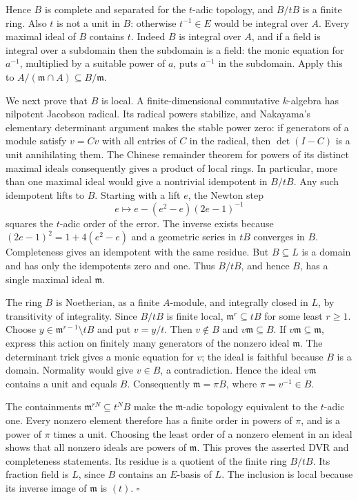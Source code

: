 Hence $B$ is complete and separated for the $t$-adic topology,
and $B/tB$ is a finite ring.  Also $t$ is not a unit in $B$:
otherwise $t^{-1}\in E$ would be integral over $A$.
Every maximal ideal of $B$ contains $t$.  Indeed $B$ is integral
over $A$, and if a field is integral over a subdomain then the
subdomain is a field: the monic equation for $a^{-1}$, multiplied
by a suitable power of $a$, puts $a^{-1}$ in the subdomain.
Apply this to $A/(\mathfrak m\cap A)\subseteq B/\mathfrak m$.

We next prove that $B$ is local.  A finite-dimensional
commutative $k$-algebra has nilpotent Jacobson radical.  Its
radical powers stabilize, and Nakayama's elementary determinant
argument makes the stable power zero: if generators of a
module satisfy $v=Cv$ with all entries of $C$ in the radical,
then $\det(I-C)$ is a unit annihilating them.
The Chinese remainder theorem for powers of its distinct
maximal ideals consequently gives a product of local rings.
In particular, more than one maximal ideal would give a
nontrivial idempotent in $B/tB$.
Any such idempotent lifts to $B$.  Starting with a lift $e$,
the Newton step
\[
            e\longmapsto e-(e^2-e)(2e-1)^{-1}
\]
squares the $t$-adic order of the error.  The inverse exists
because $(2e-1)^2=1+4(e^2-e)$ and a geometric series in $tB$
converges in $B$.  Completeness gives an idempotent with the
same residue.  But $B\subseteq L$ is a domain and has only
the idempotents zero and one.  Thus $B/tB$, and hence $B$,
has a single maximal ideal $\mathfrak m$.

The ring $B$ is Noetherian, as a finite $A$-module, and
integrally closed in $L$, by transitivity of integrality.
Since $B/tB$ is finite local, $\mathfrak m^r\subseteq tB$
for some least $r\ge1$.  Choose
$y\in\mathfrak m^{r-1}\setminus tB$ and put $v=y/t$.
Then $v\notin B$ and $v\mathfrak m\subseteq B$.
If $v\mathfrak m\subseteq\mathfrak m$, express this action
on finitely many generators of the nonzero ideal $\mathfrak m$.
The determinant trick gives a monic equation for $v$;
the ideal is faithful because $B$ is a domain.  Normality
would give $v\in B$, a contradiction.  Hence the ideal
$v\mathfrak m$ contains a unit and equals $B$.
Consequently $\mathfrak m=\pi B$, where $\pi=v^{-1}\in B$.

The containments $\mathfrak m^{rN}\subseteq t^NB$ make the
$\mathfrak m$-adic topology equivalent to the $t$-adic one.
Every nonzero element therefore has a finite order in powers
of $\pi$, and is a power of $\pi$ times a unit.  Choosing the
least order of a nonzero element in an ideal shows that all
nonzero ideals are powers of $\mathfrak m$.  This proves the asserted
DVR and completeness statements.  Its residue is a quotient
of the finite ring $B/tB$.  Its fraction field is $L$, since
$B$ contains an $E$-basis of $L$.  The inclusion is local
because its inverse image of $\mathfrak m$ is $(t)$.
\hfill$\square$

